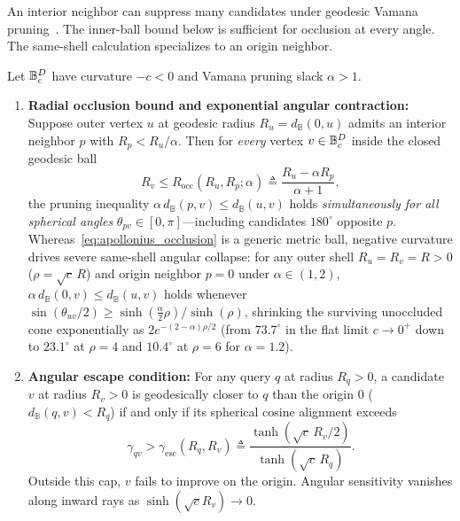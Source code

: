 An interior neighbor can suppress many candidates under geodesic {Vamana} pruning~\cite{subramanya2019diskann}. The inner-ball bound below is sufficient for occlusion at every angle. The same-shell calculation specializes to an origin neighbor.

\begin{theorem}
\label{thm:vamana_pathologies}
Let $\mathbb{B}_c^D$ have curvature $-c < 0$ and {Vamana} pruning slack $\alpha > 1$.
\begin{enumerate}
  \item \textbf{Radial occlusion bound and exponential angular contraction:}
  Suppose outer vertex $u$ at geodesic radius $R_u = d_{\mathbb{B}}(0, u)$ admits an interior neighbor $p$ with $R_p < R_u / \alpha$.
  Then for \emph{every} vertex $v \in \mathbb{B}_c^D$ inside the closed geodesic ball
  \begin{equation}
    R_v \le R_{\mathrm{occ}}(R_u, R_p; \alpha) \triangleq \frac{R_u - \alpha R_p}{\alpha + 1},
    \label{eq:apollonius_occlusion}
  \end{equation}
  the pruning inequality $\alpha\,d_{\mathbb{B}}(p, v) \le d_{\mathbb{B}}(u, v)$ holds \emph{simultaneously for all spherical angles} $\theta_{pv} \in [0, \pi]$---including candidates $180^\circ$ opposite $p$.
  Whereas~\eqref{eq:apollonius_occlusion} is a generic metric ball, negative curvature drives severe same-shell angular collapse: for any outer shell $R_u = R_v = R > 0$ ($\rho = \sqrt{c}\,R$) and origin neighbor $p = 0$ under $\alpha \in (1, 2)$, $\alpha\,d_{\mathbb{B}}(0, v) \le d_{\mathbb{B}}(u, v)$ holds whenever $\sin(\theta_{uv}/2) \ge \sinh(\frac{\alpha}{2}\rho)/\sinh(\rho)$, shrinking the surviving unoccluded cone exponentially as $2 e^{-(2-\alpha)\rho/2}$ (from $73.7^\circ$ in the flat limit $c \to 0^+$ down to $23.1^\circ$ at $\rho = 4$ and $10.4^\circ$ at $\rho = 6$ for $\alpha = 1.2$).

  \item \textbf{Angular escape condition:}
  For any query $q$ at radius $R_q > 0$, a candidate $v$ at radius $R_v > 0$ is geodesically closer to $q$ than the origin $0$ ($d_{\mathbb{B}}(q, v) < R_q$) if and only if its spherical cosine alignment exceeds
  \begin{equation}
    \gamma_{qv} > \gamma_{\mathrm{esc}}(R_q, R_v) \triangleq \frac{\tanh(\sqrt{c}\,R_v / 2)}{\tanh(\sqrt{c}\,R_q)}.
    \label{eq:escape_cap}
  \end{equation}
  Outside this cap, $v$ fails to improve on the origin. Angular sensitivity vanishes along inward rays as $\sinh(\sqrt c R_v)\to0$.


\end{enumerate}
\end{theorem}
